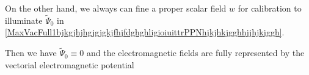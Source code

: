 \documentclass{article}
\theoremstyle{definition}
\theoremstyle{remark}
\renewcommand{\vec}[1]{\mathbf{#1}}
\newcommand{\er}{\eqref}
\newcommand{\er}{\eqref}
\begin{document}
On the other hand, we always can fine a proper scalar field $w$ for
calibration to illuminate $\tilde\Psi_0$ in
\er{MaxVacFull1bjkgjhjhgjgjgkjfhjfdghghligioiuittrPPNhjkjhkjgghhjjhjkjggh}.
%
%
%
%
\begin{comment}
or to make it to be equal to the Coulomb's Newtonian potential, i.e.
to satisfy
\begin{equation}\label{columbPPNb}
-\Delta_{\vec x}\tilde\Psi_0\equiv 4\pi\rho.
\end{equation}
For the first choice of calibration

For the second case we have
\begin{equation}\label{vhfffngghPPNhjkhjjklk}
\begin{cases}
-\Delta_{\vec x}\tilde\Psi_0\equiv 4\pi\rho
\\
-\frac{1}{c}div_{\vec x}\left\{\frac{\partial\tilde{\vec
A}}{\partial t}-\vec v\times curl_{\vec x}\tilde{\vec
A}+\nabla_{\vec x}\left(\tilde{\vec A}\cdot\vec v\right)\right\}=0
\\
\vec B= curl_{\vec x} \tilde{\vec A}\\
\vec E=-\nabla_{\vec
x}\tilde\Psi_0-\frac{1}{c}\frac{\partial\tilde{\vec A}}{\partial
t}-\frac{1}{c}\nabla_{\vec x}\left(\tilde{\vec A}\cdot\vec v\right)
\\
 \vec D=-\nabla_{\vec
x}\tilde\Psi_0-\frac{1}{c}\left(\frac{\partial\tilde{\vec
A}}{\partial t}-\vec v\times curl_{\vec x}\tilde{\vec
A}+\nabla_{\vec x}\left(\tilde{\vec A}\cdot\vec v\right)\right)
\\
\vec H\equiv curl_{\vec x} \tilde{\vec A}-\vec v\times
\left(\nabla_{\vec
x}\tilde\Psi_0+\frac{1}{c}\left(\frac{\partial\tilde{\vec
A}}{\partial t}-\vec v\times curl_{\vec x}\tilde{\vec
A}+\nabla_{\vec x}\left(\tilde{\vec A}\cdot\vec
v\right)\right)\right).
\end{cases}
\end{equation}
In both cases
\end{comment}
%
%
%
%
Then we have $\tilde\Psi_0\equiv 0$ and the electromagnetic fields
are fully represented by the vectorial electromagnetic potential
\end{document}
